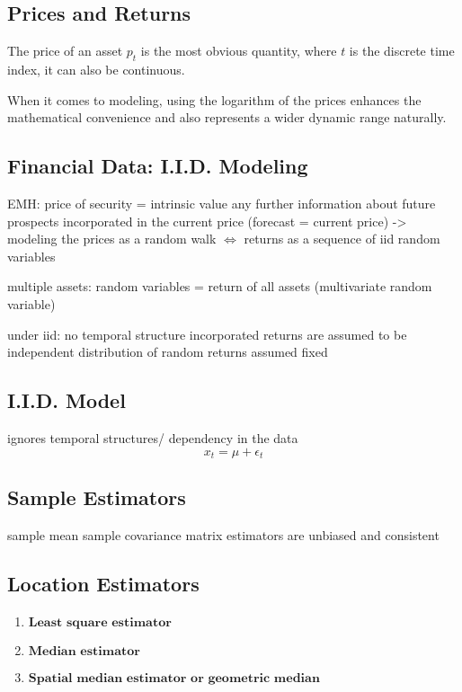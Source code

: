 

\subsection{Prices and Returns}

The price of an asset $p_t$ is the most obvious quantity, where $t$ is the discrete time index, it can also be continuous.

When it comes to modeling, using the logarithm of the prices enhances the mathematical convenience and also represents a wider dynamic range naturally.



\subsection{Financial Data: I.I.D. Modeling}
EMH: price of security = intrinsic value
any further information about future prospects incorporated in the current price (forecast = current price) 
-> modeling the prices as a random walk $\iff$ returns as a sequence of iid random variables

multiple assets: random variables = return of all assets (multivariate random variable)

under iid: no temporal structure incorporated returns are assumed to be independent distribution of random returns assumed fixed
\subsection{I.I.D. Model}
ignores temporal structures/ dependency in the data
\[x_t = \mu + \epsilon_t\]
\subsection{Sample Estimators}
sample mean
sample covariance matrix
estimators are unbiased and consistent
\subsection{Location Estimators}
\begin{enumerate}
    \item $\textbf{Least square estimator}$
    \item $\textbf{Median estimator}$
    \item $\textbf{Spatial median estimator or geometric median}$
\end{enumerate}


